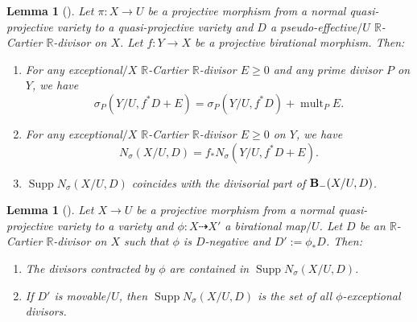 \documentclass[12pt]{amsart}
\numberwithin{equation}{section}
\newcommand{\Rr}{\mathbb{R}}
\newcommand{\Supp}{\operatorname{Supp}}
\newcommand{\mult}{\operatorname{mult}}
\newcommand{\Bb}{{\bf{B}}}
\newtheorem{lem}[thm]{Lemma}
\theoremstyle{definition}
\theoremstyle{definition}
\theoremstyle{definition}
\begin{document}
\begin{lem}[{\cite[Lemma 3.4(2)(3), Lemma 3.7(4)]{LX23}}]\label{lem: nz keep under pullback}
Let $\pi: X\rightarrow U$ be a projective morphism from a normal quasi-projective variety to a quasi-projective variety and $D$ a pseudo-effective$/U$ $\Rr$-Cartier $\Rr$-divisor on $X$. Let $f: Y\rightarrow X$ be a projective birational morphism. Then:
\begin{enumerate}
    \item For any exceptional$/X$ $\Rr$-Cartier $\Rr$-divisor $E\ge0$ and any prime divisor $P$ on $Y$, we have $$\sigma_P(Y/U,f^\ast D+E)=\sigma_P(Y/U,f^\ast D)+\mult_PE.$$
    \item For any exceptional$/X$ $\Rr$-Cartier $\Rr$-divisor $E\ge0$ on $Y$, we have 
    $$N_{\sigma}(X/U,D)=f_\ast N_{\sigma}(Y/U,f^\ast D+E).$$
    \item $\Supp N_{\sigma}(X/U,D)$ coincides with the divisorial part of $\Bb_-(X/U,D)$.
\end{enumerate}
\end{lem}

\begin{lem}[{\cite[Lemma 2.25]{LMX24b}}]\label{lem: nz for lc divisor}
Let $X\rightarrow U$ be a projective morphism from a normal quasi-projective variety to a variety and $\phi: X\dashrightarrow X'$ a birational map$/U$. Let $D$ be an $\Rr$-Cartier $\Rr$-divisor on $X$ such that $\phi$ is $D$-negative and $D':=\phi_\ast D$. Then:
\begin{enumerate}
    \item The divisors contracted by $\phi$ are contained in $\Supp N_{\sigma}(X/U,D)$.
    \item If $D'$ is movable$/U$, then $\Supp N_{\sigma}(X/U,D)$ is the set of all $\phi$-exceptional divisors.
    \end{enumerate}
 \end{lem}
\end{document}
